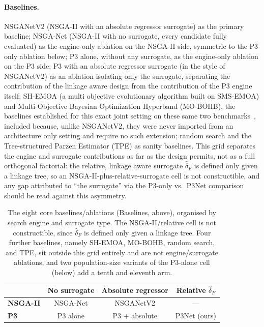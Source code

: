 \paragraph{Baselines.} NSGANetV2 (NSGA-II with an absolute regressor surrogate) as the primary baseline;
NSGA-Net (NSGA-II with no surrogate, every candidate fully evaluated) as the engine-only ablation on the
NSGA-II side, symmetric to the P3-only ablation below; P3 alone, without any surrogate, as the engine-only
ablation on the P3 side; P3 with an absolute regressor surrogate (in the style of NSGANetV2) as an ablation
isolating only the surrogate, separating the contribution of the linkage aware design from the contribution
of the P3 engine itself; SH-EMOA (a multi objective evolutionary algorithm built on SMS-EMOA) and
Multi-Objective Bayesian Optimization Hyperband (MO-BOHB), the baselines established for this exact joint
setting on these same two benchmarks~\citep{guerreroviu2021bagofbaselines}, included because, unlike
NSGANetV2, they were never imported from an architecture only setting and require no such extension; random
search and the Tree-structured Parzen Estimator (TPE) as sanity baselines.
This grid separates the engine and surrogate contributions as far as the design permits, not as a full
orthogonal factorial: the relative, linkage aware surrogate $\hat{\delta}_F$ is defined only given a linkage
tree, so an NSGA-II-plus-relative-surrogate cell is not constructible, and any gap attributed to ``the
surrogate'' via the P3-only vs.\ P3Net comparison should be read against this asymmetry.

\begin{table}[t]
    \centering
    \caption{The eight core baselines/ablations (Baselines, above), organised by search engine and surrogate
    type. The NSGA-II/relative cell is not constructible, since $\hat{\delta}_F$ is defined only given a
    linkage tree. Four further baselines, namely SH-EMOA, MO-BOHB,
    random search, and TPE, sit outside this grid entirely and are not engine/surrogate ablations, and two
    population-size variants of the P3-alone cell (below) add a tenth and eleventh arm.}
    \label{tab:ablation-grid}
    \begin{tabular}{@{}lccc@{}}
        \toprule
         & \textbf{No surrogate} & \textbf{Absolute regressor} & \textbf{Relative} $\hat{\delta}_F$ \\
        \midrule
        \textbf{NSGA-II} & NSGA-Net & NSGANetV2 & --- \\
        \textbf{P3}      & P3 alone & P3 + absolute & P3Net (ours) \\
        \bottomrule
    \end{tabular}
\end{table}


